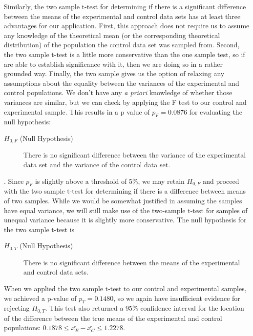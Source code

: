 \documentclass{amsart}
\begin{document}
Similarly, the two sample t-test for determining if there is a significant difference between the means of the experimental and control data sets has at least three advantages for our application. First, this approach does not require us to assume any knowledge of the theoretical mean (or the corresponding theoretical distribution) of the population the control data set was sampled from. Second, the two sample t-test is a little more conservative than the one sample test, so if are able to establish significance with it, then we are doing so in a rather grounded way. Finally, the two sample gives us the option of relaxing any assumptions about the equality between the variances of the  experimental and control populations. We don't have any \textsl{a priori} knowledge of whether those variances are similar, but we can check by applying the F test to our control and experimental sample. This results in a p value of $p_F=0.0876$ for evaluating the null hypothesis:
\begin{description}
\item[$H_{0,F}$ (Null Hypothesis)] There is no significant difference between the variance of the experimental data set and the variance of the control data set.
\end{description}.
Since $p_F$ is slightly above a threshold of 5\%, we may retain $H_{0,F}$ and proceed with the two sample t-test for determining if there is a difference between means of two samples. While we would be somewhat justified in assuming the samples have equal variance, we will still make use of the two-sample t-test for samples of unequal variance because it is slightly more conservative. The null hypothesis for the two sample t-test is
\begin{description}
\item[$H_{0,T}$ (Null Hypothesis)] There is no significant difference between the means of the experimental and control data sets.
\end{description}
When we applied the two sample t-test to our control and experimental samples, we achieved a p-value of $p_T=0.1480$, so we again have insufficient evidence for rejecting $H_{0,T}$. This test also returned a 95\% confidence interval for the location of the difference between the true means of the experimental and control populations: $0.1878\le \bar{x_E}-\bar{x_C} \le 1.2278$.
\end{document}
